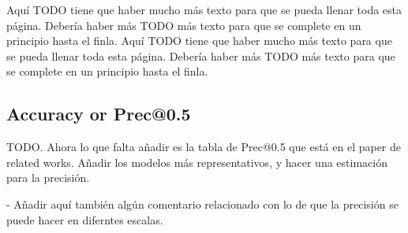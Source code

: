 Aquí TODO tiene que haber mucho más texto para que se pueda llenar toda esta
página. Debería haber más TODO más texto para que se complete en un principio
hasta el finla. Aquí TODO tiene que haber mucho más texto para que se pueda
llenar toda esta página. Debería haber más TODO más texto para que se complete
en un principio hasta el finla.


\subsection{Accuracy or Prec@0.5}\label{sec:accuracy}

TODO.
Ahora lo que falta añadir es la tabla de Prec@0.5 que está en el paper de
related works. Añadir los modelos más representativos, y hacer una estimación
para la precisión.

- Añadir aquí también algún comentario relacionado con lo de que la precisión
se puede hacer en diferntes escalas.














